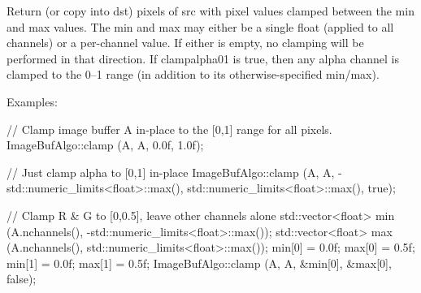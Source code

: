  

Return (or copy into {\cf dst}) pixels of {\cf src} with pixel values
clamped between the {\cf min} and {\cf max} values. The {\cf min} and
{\cf max} may either be a single float (applied to all channels) or a
per-channel value. If either is empty, no clamping will be performed in
that direction. If {\cf clampalpha01} is {\cf true}, then any alpha
channel is clamped to the 0--1 range (in addition to its otherwise-specified
min/max).

\smallskip
\noindent Examples:
\begin{code}
    // Clamp image buffer A in-place to the [0,1] range for all pixels.
    ImageBufAlgo::clamp (A, A, 0.0f, 1.0f);

    // Just clamp alpha to [0,1] in-place
    ImageBufAlgo::clamp (A, A, -std::numeric_limits<float>::max(),
                         std::numeric_limits<float>::max(), true);

    // Clamp R & G to [0,0.5], leave other channels alone
    std::vector<float> min (A.nchannels(), -std::numeric_limits<float>::max());
    std::vector<float> max (A.nchannels(), std::numeric_limits<float>::max());
    min[0] = 0.0f;  max[0] = 0.5f;
    min[1] = 0.0f;  max[1] = 0.5f;
    ImageBufAlgo::clamp (A, A, &min[0], &max[0], false);
\end{code}
\apiend


 
 


